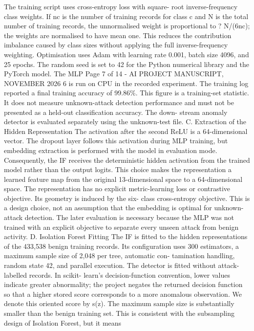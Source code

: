 \documentclass[
]{article}
\begin{document}
The training script uses cross-entropy loss with square- root
inverse-frequency class weights. If nc is the number of training records
for class c and N is the total number of training records, the
unnormalised weight is proportional to ? N/(6nc); the weights are
normalised to have mean one. This reduces the contribution imbalance
caused by class sizes without applying the full inverse-frequency
weighting. Optimisation uses Adam with learning rate 0.001, batch size
4096, and 25 epochs. The random seed is set to 42 for the Python
numerical library and the PyTorch model. The MLP Page 7 of 14 - AI
PROJECT MANUSCRIPT, NOVEMBER 2026 6 is run on CPU in the recorded
experiment. The training log reported a final training accuracy of
99.86\%. This figure is a training-set statistic. It does not measure
unknown-attack detection performance and must not be presented as a
held-out classification accuracy. The down- stream anomaly detector is
evaluated separately using the unknown-test file. C. Extraction of the
Hidden Representation The activation after the second ReLU is a
64-dimensional vector. The dropout layer follows this activation during
MLP training, but embedding extraction is performed with the model in
evaluation mode. Consequently, the IF receives the deterministic hidden
activation from the trained model rather than the output logits. This
choice makes the representation a learned feature map from the original
13-dimensional space to a 64-dimensional space. The representation has
no explicit metric-learning loss or contrastive objective. Its geometry
is induced by the six- class cross-entropy objective. This is a design
choice, not an assumption that the embedding is optimal for
unknown-attack detection. The later evaluation is necessary because the
MLP was not trained with an explicit objective to separate every unseen
attack from benign activity. D. Isolation Forest Fitting The IF is
fitted to the hidden representations of the 433,538 benign training
records. Its configuration uses 300 estimators, a maximum sample size of
2,048 per tree, automatic con- tamination handling, random state 42, and
parallel execution. The detector is fitted without attack-labelled
records. In scikit- learn's decision-function convention, lower values
indicate greater abnormality; the project negates the returned decision
function so that a higher stored score corresponds to a more anomalous
observation. We denote this oriented score by s(z). The maximum sample
size is substantially smaller than the benign training set. This is
consistent with the subsampling design of Isolation Forest, but it means
\end{document}
